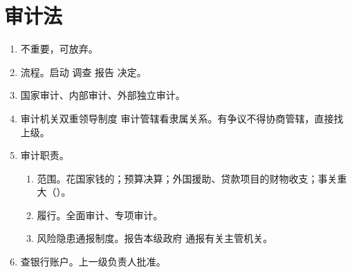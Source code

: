 \section{审计法}
\begin{enumerate}
  \item 不重要，可放弃。
  \item 流程。启动 \yjt 调查 \yjt 报告 \yjt 决定。
  \item 国家审计、内部审计、外部独立审计。
  \item 审计机关双重领导制度 \yjt 审计管辖看隶属关系。有争议不得协商管辖，直接找上级。
  \item 审计职责。
        \begin{enumerate}
          \item 范围。花国家钱的；预算决算；外国援助、贷款项目的财物收支；事关重大（）。
          \item 履行。全面审计、专项审计。
          \item 风险隐患通报制度。报告本级政府 \hz 通报有关主管机关。
        \end{enumerate}
  \item 查银行账户。上一级负责人批准。
\end{enumerate}
